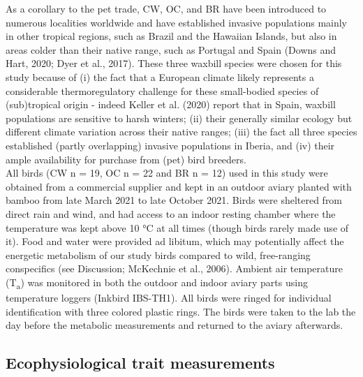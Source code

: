 \documentclass[10pt, twoside]{book} %
\begin{document}
As a corollary to the pet trade, CW, OC, and BR have been introduced to numerous localities worldwide and have established invasive populations mainly in other tropical regions, such as Brazil and the Hawaiian Islands, but also in areas colder than their native range, such as Portugal and Spain (Downs and Hart, 2020; Dyer et al., 2017). These three waxbill species were chosen for this study because of (i) the fact that a European climate likely represents a considerable thermoregulatory challenge for these small-bodied species of (sub)tropical origin - indeed Keller et al. (2020) report that in Spain, waxbill populations are sensitive to harsh winters; (ii) their generally similar ecology but different climate variation across their native ranges; (iii) the fact all three species established (partly overlapping) invasive populations in Iberia, and (iv) their ample availability for purchase from (pet) bird breeders.\\

All birds (CW n = 19, OC n = 22 and BR n = 12) used in this study were obtained from a commercial supplier and kept in an outdoor aviary planted with bamboo from late March 2021 to late October 2021. Birds were sheltered from direct rain and wind, and had access to an indoor resting chamber where the temperature was kept above 10 °C at all times (though birds rarely made use of it). Food and water were provided ad libitum, which may potentially affect the energetic metabolism of our study birds compared to wild, free-ranging conspecifics (see Discussion; McKechnie et al., 2006). Ambient air temperature (T\textsubscript{a}) was monitored in both the outdoor and indoor aviary parts using temperature loggers (Inkbird IBS-TH1). All birds were ringed for individual identification with three colored plastic rings. The birds were taken to the lab the day before the metabolic measurements and returned to the aviary afterwards.\\

\subsection{Ecophysiological trait measurements}
\end{document}
